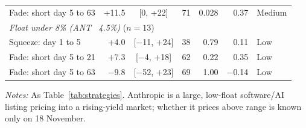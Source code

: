 \begin{table}[!htbp]
\begin{threeparttable}
\begin{tabular}{lrcrrrl}
\quad Fade: short day 5 to 63 & +11.5 & [0, +22] & 71 & 0.028 & 0.37 & Medium \\
\multicolumn{7}{l}{\textit{Float under 8\% (ANT ~4.5\%)} ($n=13$)} \\
\quad Squeeze: day 1 to 5 & +4.0 & [$-$11, +24] & 38 & 0.79 & 0.11 & Low \\
\quad Fade: short day 5 to 21 & +7.3 & [$-$4, +18] & 62 & 0.22 & 0.35 & Low \\
\quad Fade: short day 5 to 63 & $-$9.8 & [$-$52, +23] & 69 & 1.00 & $-$0.14 & Low \\
\bottomrule
\end{tabular}
\begin{tablenotes}[flushleft]\footnotesize
\item \textit{Notes:} As Table~\ref{tab:strategies}. Anthropic is a large, low-float software/AI listing pricing into a rising-yield market; whether it prices above range is known only on 18 November.
\end{tablenotes}
\end{threeparttable}

\end{table}

